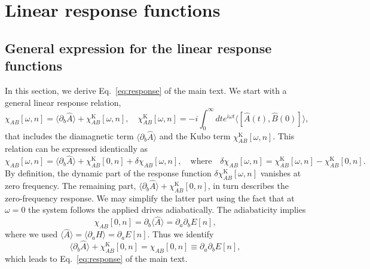 \documentclass[aps,reprint,longbibliography, prb]{revtex4-2}
\begin{document}
\section{Linear response functions}
\label{sec:app-resp-fun}
\subsection{General expression for the linear response functions}
\label{app:general_lin_resp}
In this section, we derive Eq.~\eqref{eq:response} of the main text. We start with a general linear response relation,
\begin{equation}
    \chi_{AB}[\omega, n] = \langle \partial_b \hat{A}\rangle + \chi^\mathrm{K}_{AB}[\omega, n],\quad \chi^\mathrm{K}_{AB}[\omega,n] = -i\int_{0}^{\infty}dt e^{i\omega t}\langle[\hat{A}(t),\hat{B}(0)]\rangle,
\end{equation}
that includes the diamagnetic term $\langle \partial_b \hat{A}\rangle$ and the Kubo term $\chi^\mathrm{K}_{AB}[\omega,n]$. This relation can be expressed identically as
\begin{equation}
    \chi_{AB}[\omega, n] = \langle\partial_b \hat{A} \rangle + \chi_{AB}^\mathrm{K}[0, n] + \delta\chi_{AB}[\omega, n],\quad \text{where}\quad \delta\chi_{AB}[\omega, n] = \chi_{AB}^\mathrm{K}[\omega, n] - \chi_{AB}^\mathrm{K}[0, n].  
\end{equation}
By definition, the dynamic part of the response function $\delta\chi^\mathrm{K}_{AB}[\omega,n]$ vanishes at zero frequency. The remaining part, $\langle\partial_b \hat{A} \rangle + \chi_{AB}^\mathrm{K}[0, n]$, in turn describes the zero-frequency response. We may simplify the latter part using the fact that at $\omega = 0$ the system follows the applied drives adiabatically. The adiabaticity implies
\begin{equation}
    \chi_{AB}[0, n] = \partial_{b}\langle \hat{A} \rangle = \partial_{a} \partial_b E[n],
\end{equation}
where we used $\langle \hat{A} \rangle = \langle \partial_a H\rangle = \partial_a E[n]$.  Thus we identify
\begin{equation}
     \langle\partial_b \hat{A} \rangle + \chi_{AB}^\mathrm{K}[0, n] = \chi_{AB}[0, n] \equiv\partial_{a}\partial_{b} E[n],
\end{equation}
which leads to Eq.~\eqref{eq:response} of the main text.
\end{document}
